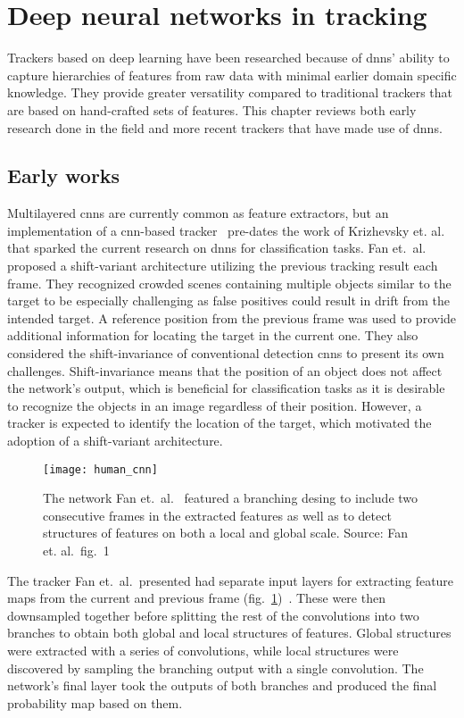 \section{Deep neural networks in tracking}
Trackers based on deep learning have been researched because of \ac{dnn}s' ability
to capture hierarchies of features from raw data with minimal earlier domain specific
knowledge. They provide greater versatility compared to traditional trackers that are
based on hand-crafted sets of features. This chapter reviews both early research
done in the field and more recent trackers that have made use of \ac{dnn}s.

\subsection{Early works}
Multilayered \ac{cnn}s are currently common as feature extractors, but an implementation
of a \ac{cnn}-based tracker~\cite{HUMAN_CNN} pre-dates the work of Krizhevsky et.
al.~\cite{NIPS_IMAGENET} that sparked the current research on \ac{dnn}s for classification
tasks. Fan et.~al.~\cite{HUMAN_CNN} proposed a shift-variant architecture utilizing the
previous tracking result each frame. They recognized crowded scenes containing multiple
objects similar to the target to be especially challenging as false positives could result
in drift from the intended target. A reference position from the previous frame was used
to provide additional information for locating the target in the current one. They also
considered the shift-invariance of conventional detection \ac{cnn}s to present its
own challenges. Shift-invariance means that the position of an object does not affect the
network's output, which is beneficial for classification tasks as it is desirable to
recognize the objects in an image regardless of their position. However, a tracker is
expected to identify the location of the target, which motivated the adoption of a
shift-variant architecture.~\cite{HUMAN_CNN}

\begin{figure}[H]
\centering
\texttt{[image: human\_cnn]}
\caption{The network Fan et.~al.~\cite{HUMAN_CNN} featured a branching desing to
         include two consecutive frames in the extracted features as well as to detect
         structures of features on both a local and global scale. Source: Fan et.
         al.~fig.~1~\cite{HUMAN_CNN}}\label{fig:human_cnn}
\end{figure}

The tracker Fan et.~al.~presented had separate input layers for extracting feature
maps from the current and previous frame (fig.~\ref{fig:human_cnn})~\cite{HUMAN_CNN}.
These were then downsampled together before splitting the rest of the convolutions
into two branches to obtain both global and local structures of features. Global
structures were extracted with a series of convolutions, while local structures were
discovered by sampling the branching output with a single convolution. The network's
final layer took the outputs of both branches and produced the final probability map
based on them.~\cite{HUMAN_CNN}

